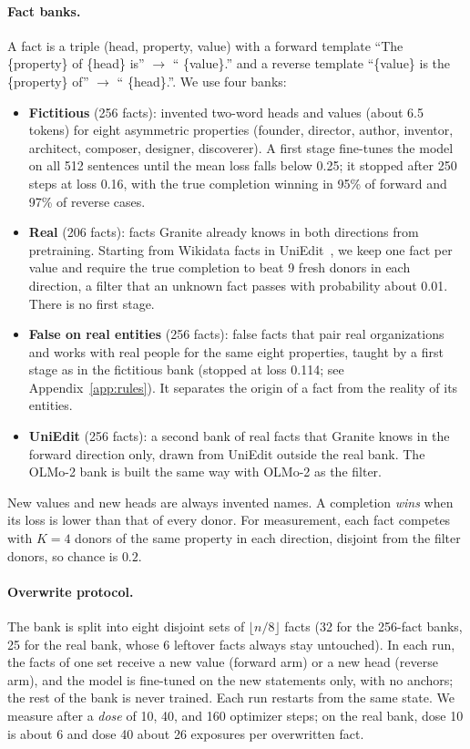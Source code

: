 \documentclass[11pt]{article}
\begin{document}
\paragraph{Fact banks.}
A fact is a triple (head, property, value) with a forward template ``The \{property\} of \{head\} is'' $\rightarrow$ `` \{value\}.'' and a reverse template ``\{value\} is the \{property\} of'' $\rightarrow$ `` \{head\}.''.
We use four banks:
\begin{itemize}
  \item \textbf{Fictitious} (256 facts): invented two-word heads and values (about 6.5 tokens) for eight asymmetric properties (founder, director, author, inventor, architect, composer, designer, discoverer). A first stage fine-tunes the model on all 512 sentences until the mean loss falls below 0.25; it stopped after 250 steps at loss 0.16, with the true completion winning in 95\% of forward and 97\% of reverse cases.
  \item \textbf{Real} (206 facts): facts Granite already knows in both directions from pretraining. Starting from Wikidata facts in UniEdit~\citep{chen2025uniedit}, we keep one fact per value and require the true completion to beat 9 fresh donors in each direction, a filter that an unknown fact passes with probability about 0.01. There is no first stage.
  \item \textbf{False on real entities} (256 facts): false facts that pair real organizations and works with real people for the same eight properties, taught by a first stage as in the fictitious bank (stopped at loss 0.114; see Appendix~\ref{app:rules}). It separates the origin of a fact from the reality of its entities.
  \item \textbf{UniEdit} (256 facts): a second bank of real facts that Granite knows in the forward direction only, drawn from UniEdit outside the real bank. The OLMo-2 bank is built the same way with OLMo-2 as the filter.
\end{itemize}
New values and new heads are always invented names.
A completion \emph{wins} when its loss is lower than that of every donor.
For measurement, each fact competes with $K=4$ donors of the same property in each direction, disjoint from the filter donors, so chance is $0.2$.

\paragraph{Overwrite protocol.}
The bank is split into eight disjoint sets of $\lfloor n/8\rfloor$ facts (32 for the 256-fact banks, 25 for the real bank, whose 6 leftover facts always stay untouched).
In each run, the facts of one set receive a new value (forward arm) or a new head (reverse arm), and the model is fine-tuned on the new statements only, with no anchors; the rest of the bank is never trained.
Each run restarts from the same state.
We measure after a \emph{dose} of 10, 40, and 160 optimizer steps; on the real bank, dose 10 is about 6 and dose 40 about 26 exposures per overwritten fact.
\end{document}

